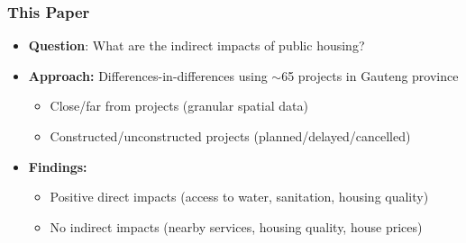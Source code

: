 \documentclass[aspectratio=32]{beamer}
\begin{document}





\begin{frame}
\frametitle{This Paper}

\centering

\begin{itemize}
  \item \textbf{Question}: What are the indirect impacts of public housing?
\vspace{.3cm}

\item \textbf{Approach:} Differences-in-differences using $\sim$65 projects in Gauteng province
\vspace{3mm}
  \begin{itemize}
          \item Close/far from projects (granular spatial data)
          \item Constructed/unconstructed projects (planned/delayed/cancelled)
    \end{itemize}
\vspace{.3cm}

\item \textbf{Findings:}
  \begin{itemize}
    \item Positive direct impacts (access to water, sanitation, housing quality)
    \item No indirect impacts (nearby services, housing quality, house prices)
  \end{itemize}

\end{itemize}

\end{frame}
\end{document}
